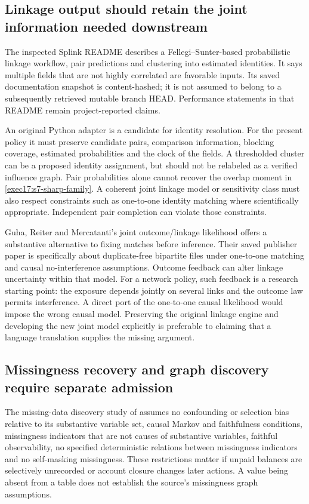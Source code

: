\subsection{Linkage output should retain the joint information needed downstream}

The inspected Splink README describes a Fellegi--Sunter-based probabilistic
linkage workflow, pair predictions and clustering into estimated identities.
It says multiple fields that are not highly correlated are favorable inputs.
Its saved documentation snapshot is content-hashed; it is not assumed to
belong to a subsequently retrieved mutable branch HEAD. Performance statements
in that README remain project-reported claims.\citep{sw_splink}

An original Python adapter is a candidate for identity resolution. For the
present policy it must preserve candidate pairs, comparison information,
blocking coverage, estimated probabilities and the clock of the fields.
A thresholded cluster can be a proposed identity assignment, but should not
be relabeled as a verified influence graph. Pair probabilities alone cannot
recover the overlap moment in \eqref{exec17:s7-sharp-family}. A coherent joint
linkage model or sensitivity class must also respect constraints such as
one-to-one identity matching where scientifically appropriate. Independent
pair completion can violate those constraints.

Guha, Reiter and Mercatanti's joint outcome/linkage likelihood offers a
substantive alternative to fixing matches before inference. Their saved
publisher paper is specifically about duplicate-free bipartite files under
one-to-one matching and causal no-interference assumptions. Outcome feedback
can alter linkage uncertainty within that model.\citep{guha2022} For a network
policy, such feedback is a research starting point: the exposure depends
jointly on several links and the outcome law permits interference. A direct
port of the one-to-one causal likelihood would impose the wrong causal model.
Preserving the original linkage engine and developing the new joint model
explicitly is preferable to claiming that a language translation supplies the
missing argument.

\subsection{Missingness recovery and graph discovery require separate admission}

The missing-data discovery study of \citet{tu2019} assumes no confounding or
selection bias relative to its substantive variable set, causal Markov and
faithfulness conditions, missingness indicators that are not causes of
substantive variables, faithful observability, no specified deterministic
relations between missingness indicators and no self-masking missingness.
These restrictions matter if unpaid balances are selectively unrecorded or
account closure changes later actions. A value being absent from a table
does not establish the source's missingness graph assumptions.

